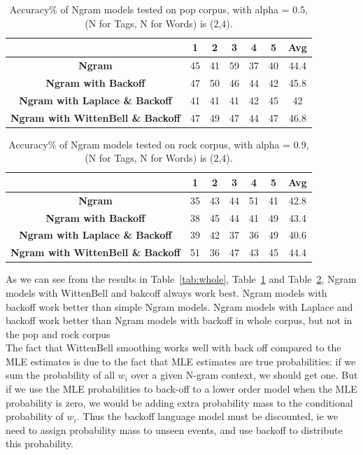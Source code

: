 \documentclass[a4paper,12pt]{article}
\begin{document}
\begin{table}[]
\centering
\begin{tabular}{|c|c|c|c|c|c|c|}
\hline
\rowcolor[HTML]{EFEFEF} 
& \textbf{1} & \textbf{2} & \textbf{3} & \textbf{4} & \textbf{5} & \textbf{Avg} \\ \hline
\cellcolor[HTML]{EFEFEF}\textbf{Ngram} & 45 & 41 & 59 & 37 & 40 & 44.4 \\ \hline
\cellcolor[HTML]{EFEFEF}\textbf{Ngram with Backoff} & 47 & 50 & 46 & 44 & 42 & 45.8 \\ \hline
\cellcolor[HTML]{EFEFEF}\textbf{Ngram with Laplace \& Backoff} & 41 & 41 & 41 & 42 & 45 & 42 \\ \hline
\cellcolor[HTML]{EFEFEF}\textbf{Ngram with WittenBell \& Backoff} & 47 & 49 & 47 & 44 & 47 & 46.8 \\ \hline
\end{tabular}
\caption{Accuracy\% of Ngram models tested on pop corpus, with alpha = 0.5, (N for Tags, N for Words) is (2,4).}
\label{tab:pop}
\end{table}

\begin{table}[]
\centering
\begin{tabular}{|c|c|c|c|c|c|c|}
\hline
\rowcolor[HTML]{EFEFEF} 
 & \textbf{1} & \textbf{2} & \textbf{3} & \textbf{4} & \textbf{5} & \textbf{Avg} \\ \hline
\cellcolor[HTML]{EFEFEF}\textbf{Ngram} & 35 & 43 & 44 & 51 & 41 & 42.8 \\ \hline
\cellcolor[HTML]{EFEFEF}\textbf{Ngram with Backoff} & 38 & 45 & 44 & 41 & 49 & 43.4 \\ \hline
\cellcolor[HTML]{EFEFEF}\textbf{Ngram with Laplace \& Backoff} & 39 & 42 & 37 & 36 & 49 & 40.6 \\ \hline
\cellcolor[HTML]{EFEFEF}\textbf{Ngram with WittenBell \& Backoff} & 51 & 36 & 47 & 43 & 45 & 44.4 \\ \hline
\end{tabular}
\caption{Accuracy\% of Ngram models tested on rock corpus, with alpha = 0.9, (N for Tags, N for Words) is (2,4).}
\label{tab:rock}
\end{table}
As we can see from the results in Table~\ref{tab:whole}, Table~\ref{tab:pop} and Table~\ref{tab:rock}, Ngram models with WittenBell and bakcoff always work best. Ngram models with backoff work better than simple Ngram models. Ngram models with Laplace and backoff work better than Ngram models with backoff in whole corpus, but not in the pop and rock corpus\\
The fact that WittenBell smoothing works well with back off compared to the MLE estimates is due to the fact that MLE estimates are true probabilities: if we sum the probability of all $w_i$ over a given N-gram context, we should get one. But if we use the MLE probabilities to back-off to a lower order model when the MLE probability is zero, we would be adding extra probability mass to the conditional probability of $w_i$. Thus the backoff language model must be discounted, ie we need to assign probability mass to unseen events, and use backoff to distribute this probability. 
\end{document}
